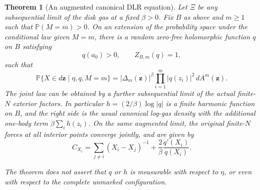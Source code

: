 \documentclass[11pt,a4paper]{article}
\numberwithin{equation}{section}
\newtheorem{theorem}{Theorem}[section]
\theoremstyle{definition}
\theoremstyle{remark}
\begin{document}
\begin{theorem}[An augmented canonical DLR equation]
\label{thm:augmented-canonical-dlr}
Let $\Xi$ be any subsequential limit of the disk gas at a fixed
$\beta>0$. Fix $B$ as above and $m\ge1$ such that $\mathbb P(M=m)>0$.
On an extension of the probability space under the conditional law
given $M=m$, there is a random zero-free holomorphic function $q$ on
$B$ satisfying
\[
 q(a_0)>0,\qquad Z_{B,m}(q)=1,
\]
such that
\begin{equation}\label{eq:augmented-canonical-dlr}
 \mathbb P\{X\in d\mathbf z\mid\eta,q,M=m\}
   =|\Delta_m(\mathbf z)|^\beta
                       \prod_{i=1}^m|q(z_i)|^2\,dA^m(\mathbf z).
\end{equation}
The joint law can be obtained by a further subsequential limit of the
actual finite-$N$ exterior factors. In particular
$h=(2/\beta)\log|q|$ is a finite harmonic function on $B$, and the
right side is the usual canonical log-gas density with the additional
one-body term $\beta\sum_i h(z_i)$.
On the same augmented limit, the original finite-$N$ forces at all
interior points converge jointly, and are given by
\begin{equation}\label{eq:augmented-harmonic-force}
 C_{X_i}=\sum_{j\ne i}(X_i-X_j)^{-1}
                         +\frac2\beta\frac{q'(X_i)}{q(X_i)}.
\end{equation}

The theorem does not assert that $q$ or $h$ is measurable with respect
to $\eta$, or even with respect to the complete unmarked configuration.
\end{theorem}
\end{document}

